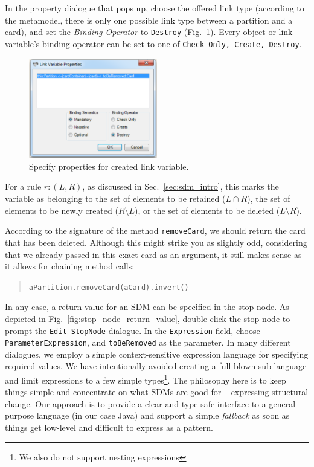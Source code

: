 In the property dialogue that pops up, choose the offered link type (according
to the metamodel, there is only one possible link type between a partition and a
card), and set the \emph{Binding Operator} to \texttt{Destroy}
(Fig.~\ref{fig:link_variable_properties}). Every object or link variable's
binding operator can be set to one of \texttt{Check Only, Create,
Destroy}.\clearpage

\begin{figure}[htp] 
\begin{center}
  \includegraphics[width=0.5\textwidth]{pics/sdmBilder/removeCard/sdm12RAW}
  \caption{Specify properties for created link variable.}  
  \label{fig:link_variable_properties}
\end{center}
\end{figure}



For a rule $r: (L, R)$, as discussed in Sec.~\ref{sec:sdm_intro}, this marks the
variable as belonging to the set of elements to be retained ($L\cap R$), the set
of elements to be newly created ($R\setminus L$), or the set of elements to be
deleted ($L\setminus R$).
 
According to the signature of the method \texttt{removeCard}, we should return
the card that has been deleted.  Although this might strike you as slightly odd,
considering that we already passed in this exact card as an argument, it still
makes sense as it allows for chaining method calls:
\begin{quote}\texttt{aPartition.removeCard(aCard).invert()}\end{quote}
In any case, a return value for an SDM can be specified in the stop node.
As depicted in Fig.~\ref{fig:stop_node_return_value}, double-click the stop
node to prompt the \texttt{Edit StopNode} dialogue.
In the \texttt{Expression} field, choose \texttt{ParameterExpression}, and
\texttt{toBeRemoved} as the parameter.  In many different dialogues, we employ a
simple context-sensitive expression language for specifying required values.  We
have intentionally avoided creating a full-blown sub-language and limit
expressions to a few simple types\footnote{We also do not support nesting
expressions}.  The philosophy here is to keep things simple and concentrate on
what SDMs are good for -- expressing structural change.  Our approach is to
provide a clear and type-safe interface to a general purpose language (in our
case Java) and support a simple \emph{fallback} as soon as things get low-level
and difficult to express as a pattern.  

